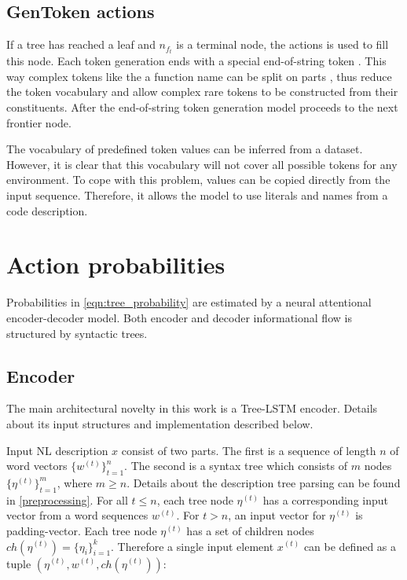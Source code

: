 \subsection{GenToken actions} \label{gentoken}
If a tree has reached a leaf and $n_{f_t}$ is a terminal node, the  actions is used to fill this node. Each token generation ends with a special end-of-string token . This way complex tokens like the a function name  can be split on parts , thus reduce the token vocabulary and allow complex rare tokens to be constructed from their constituents. After the end-of-string token generation model proceeds to the next frontier node.

The vocabulary of predefined token values can be inferred from a dataset. However, it is clear that this vocabulary will not cover all possible tokens for any environment. To cope with this problem, values can be copied directly from the input sequence. Therefore, it allows the model to use literals and names from a code description.

\section{Action probabilities}
Probabilities in \cref{eqn:tree_probability} are estimated by a neural attentional encoder-decoder model. Both encoder and decoder informational flow is structured by syntactic trees. 

\subsection{Encoder}
The main architectural novelty in this work is a Tree-LSTM encoder. Details about its input structures and implementation described below.

Input NL description $x$ consist of two parts. The first is a sequence of length $n$ of word vectors $\{w^{(t)}\}^n_{t=1}$. The second is a syntax tree which consists of $m$ nodes $\{\eta^{(t)}\}^m_{t=1}$, where $m\geq n$. Details about the description tree parsing can be found in \cref{preprocessing}. For all $t \leq n$, each tree node $\eta^{(t)}$ has a corresponding input vector from a word sequences $w^{(t)}$. For $t > n$, an input vector for $\eta^{(t)}$ is padding-vector. Each tree node $\eta^{(t)}$ has a set of children nodes $ch(\eta^{(t)})=\{\eta_{i}\}^k_{i=1}$. Therefore a single input element $x^{(t)}$ can be defined as a tuple $(\eta^{(t)}, w^{(t)}, ch(\eta^{(t)}))$:

